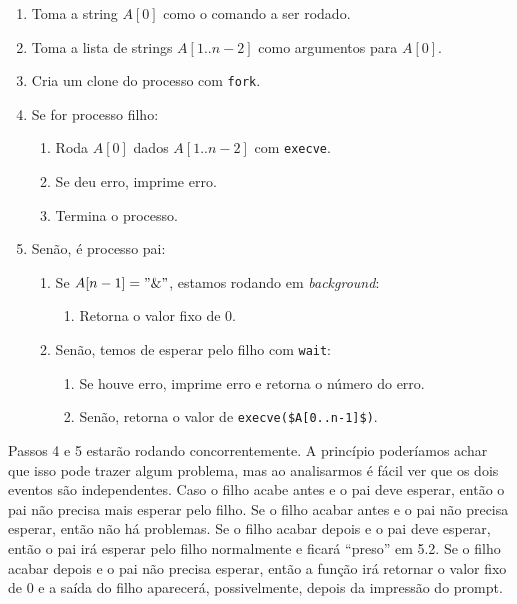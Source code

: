 \documentclass{amsart}
\theoremstyle{plain}
\newcommand{\code}[1]{\lstinline[mathescape=true]{#1}}
\newcommand{\mcode}[1]{\lstinline[mathescape]!#1!}
\begin{document}
\begin{enumerate}[label*=\arabic*.]
  \item Toma a string $A[0]$ como o comando a ser rodado.
  \item Toma a lista de strings $A[1..n-2]$ como argumentos para $A[0]$.
  \item Cria um clone do processo com \code{fork}.
  \item Se for processo filho:
  \begin{enumerate}[label*=\arabic*.]
    \item Roda $A[0]$ dados $A[1..n-2]$ com \code{execve}.
    \item Se deu erro, imprime erro.
    \item Termina o processo.
  \end{enumerate}
  \item Senão, é processo pai:
  \begin{enumerate}[label*=\arabic*.]
    \item Se $A[n-1] = "\&"$, estamos rodando em \textit{background}:
    \begin{enumerate}[label*=\arabic*.]
      \item Retorna o valor fixo de 0.
    \end{enumerate}
    \item Senão, temos de esperar pelo filho com \code{wait}:
      \begin{enumerate}[label*=\arabic*.]
        \item Se houve erro, imprime erro e retorna o número do erro.
        \item Senão, retorna o valor de \mcode{execve($A[0..n-1]$)}.
      \end{enumerate}
  \end{enumerate}
\end{enumerate}

Passos 4 e 5 estarão rodando concorrentemente. A princípio poderíamos achar que isso pode trazer
algum problema, mas ao analisarmos é fácil ver que os dois eventos são independentes. Caso o filho
acabe antes e o pai deve esperar, então o pai não precisa mais esperar pelo filho. Se o filho
acabar antes e o pai não precisa esperar, então não há problemas. Se o filho acabar depois e o pai
deve esperar, então o pai irá esperar pelo filho normalmente e ficará ``preso'' em 5.2. Se o filho
acabar depois e o pai não precisa esperar, então a função irá retornar o valor fixo de 0 e a saída
do filho aparecerá, possivelmente, depois da impressão do prompt.
\end{document}
